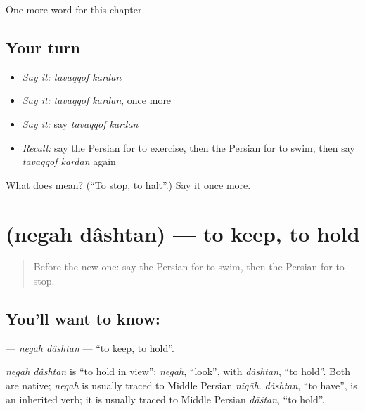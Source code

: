 \begin{grammarlens}[title={What you've built}]
One more word for this chapter.
\end{grammarlens}

\subsection*{Your turn}
\begin{itemize}
\raggedright
  \item \emph{Say it:} \emph{tavaqqof kardan}
  \item \emph{Say it:} \emph{tavaqqof kardan}, once more
  \item \emph{Say it:} say \emph{tavaqqof kardan}
  \item \emph{Recall:} say the Persian for to exercise, then the Persian for to swim, then say \emph{tavaqqof kardan} again
\end{itemize}

\begin{tcolorbox}[breakable,colback=teal!4,colframe=teal!35!black,title={Before you move on}]
What does   mean? (\textquotedblleft{}To stop, to halt\textquotedblright{}.) Say it once more.
\end{tcolorbox}
\section[\texorpdfstring{\fa{نگه} \fa{داشتن} (negah dâshtan)}{نگه داشتن (negah dâshtan)}]{  (negah dâshtan) — to keep, to hold}

\label{lesson:FA-C219-negah-dashtan}



\begin{quote}
Before the new one: say the Persian for to swim, then the Persian for to stop.
\end{quote}

\subsection*{You'll want to know:  }
\textbf{ } — \emph{negah dâshtan} — \textquotedblleft{}to keep, to hold\textquotedblright{}.

\begin{cousinweb}
\emph{negah dâshtan} is \textquotedblleft{}to hold in view\textquotedblright{}: \emph{negah}, \textquotedblleft{}look\textquotedblright{}, with \emph{dâshtan}, \textquotedblleft{}to hold\textquotedblright{}. Both are native; \emph{negah} is usually traced to Middle Persian \emph{nigāh}. \emph{dâshtan}, \textquotedblleft{}to have\textquotedblright{}, is an inherited verb; it is usually traced to Middle Persian \emph{dāštan}, \textquotedblleft{}to hold\textquotedblright{}.
\end{cousinweb}


